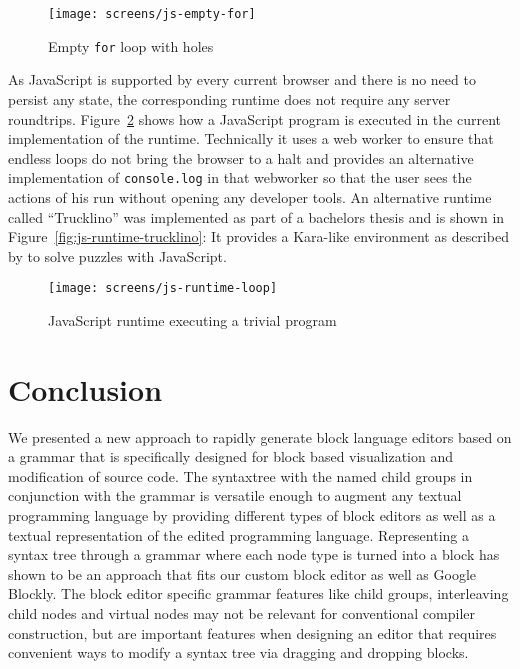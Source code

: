 \documentclass[sigconf,natbib=false]{acmart}
\newcommand{\enquote}[1]{``#1''}
\begin{document}
\begin{figure}[H]
  \texttt{[image: screens/js-empty-for]}
  \caption{Empty \texttt{for} loop with holes}
  \label{fig:screen-js-empty-for}
\end{figure}

As JavaScript is supported by every current browser and there is no need to persist any state, the corresponding runtime does not require any server roundtrips. Figure~\ref{fig:screen-js-runtime-loop} shows how a JavaScript program is executed in the current implementation of the runtime. Technically it uses a web worker to ensure that endless loops do not bring the browser to a halt and provides an alternative implementation of \texttt{console.log} in that webworker so that the user sees the actions of his run without opening any developer tools. An alternative runtime called \enquote{Trucklino} was implemented as part of a bachelors thesis\cite{popp_konzeption_2019} and is shown in Figure~\ref{fig:js-runtime-trucklino}: It provides a Kara-like environment as described by \cite{hartmann_kara_2001} to solve puzzles with JavaScript.

\begin{figure}
  \texttt{[image: screens/js-runtime-loop]}
  \caption{JavaScript runtime executing a trivial program}
  \label{fig:screen-js-runtime-loop}
\end{figure}

\section{Conclusion}

We presented a new approach to rapidly generate block language editors based on a grammar that is specifically designed for block based visualization and modification of source code. The syntaxtree with the named child groups in conjunction with the grammar is versatile enough to augment any textual programming language by providing different types of block editors as well as a textual representation of the edited programming language. Representing a syntax tree through a grammar where each node type is turned into a block has shown to be an approach that fits our custom block editor as well as Google Blockly. The block editor specific grammar features like child groups, interleaving child nodes and virtual nodes may not be relevant for conventional compiler construction, but are important features when designing an editor that requires convenient ways to modify a syntax tree via dragging and dropping blocks.
\end{document}
